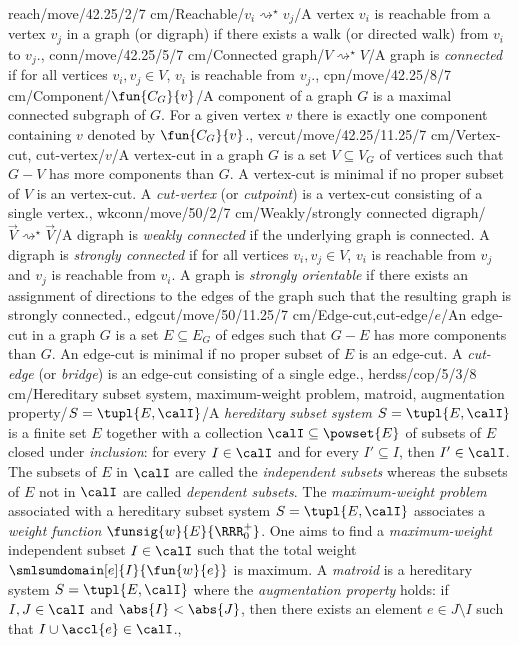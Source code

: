 reach/move/42.25/2/7 cm/{Reachable}/{$v_i\rightsquigarrow^{\star} v_j$}/{A vertex $v_i$ is reachable from a vertex $v_j$ in a graph (or digraph) if there exists a walk (or directed walk) from $v_i$ to $v_j$.},
conn/move/42.25/5/7 cm/{Connected graph}/{$V\rightsquigarrow^{\star}V$}/{A graph is \emph{connected} if for all vertices $v_i,v_j\in V$, $v_i$ is reachable from $v_j$.},
cpn/move/42.25/8/7 cm/{Component}/{$\fun{C_G}{v}$}/{A component of a graph $G$ is a maximal connected subgraph of $G$. For a given vertex $v$ there is exactly one component containing $v$ denoted by $\fun{C_G}{v}$.},
vercut/move/42.25/11.25/7 cm/{Vertex-cut, cut-vertex}/{\Rightscissors$v$}/{A vertex-cut in a graph $G$ is a set $V\subseteq V_G$ of vertices such that $G-V$ has more components than $G$. A vertex-cut is minimal if no proper subset of $V$ is an vertex-cut. A \emph{cut-vertex} (or \emph{cutpoint}) is a vertex-cut consisting of a single vertex.},
wkconn/move/50/2/7 cm/{Weakly/strongly connected digraph}/{$\vec{V}\rightsquigarrow^{\star}\vec{V}$}/{A digraph is \emph{weakly connected} if the underlying graph is connected. A digraph is \emph{strongly connected} if for all vertices $v_i,v_j\in V$, $v_i$ is reachable from $v_j$ and $v_j$ is reachable from $v_i$. A graph is \emph{strongly orientable} if there exists an assignment of directions to the edges of the graph such that the resulting graph is strongly connected.},
edgcut/move/50/11.25/7 cm/{Edge-cut,cut-edge}/{\Rightscissors$e$}/{An edge-cut in a graph $G$ is a set $E\subseteq E_G$ of edges such that $G-E$ has more components than $G$. An edge-cut is minimal if no proper subset of $E$ is an edge-cut. A \emph{cut-edge} (or \emph{bridge}) is an edge-cut consisting of a single edge.},
herdss/cop/5/3/8 cm/{Hereditary subset system, maximum-weight problem, matroid, augmentation property}/{$S=\tupl{E,\calI}$}/{A \emph{hereditary subset system} $S=\tupl{E,\calI}$ is a finite set $E$ together with a collection $\calI\subseteq\powset{E}$ of subsets of $E$ closed under \emph{inclusion}: for every $I\in\calI$ and for every $I'\subseteq I$, then $I'\in\calI$. The subsets of $E$ in $\calI$ are called the \emph{independent subsets} whereas the subsets of $E$ not in $\calI$ are called \emph{dependent subsets}. The \emph{maximum-weight problem} associated with a hereditary subset system $S=\tupl{E,\calI}$ associates a \emph{weight function} $\funsig{w}{E}{\RRR^+_0}$. One aims to find a \emph{maximum-weight} independent subset $I\in\calI$ such that the total weight $\smlsumdomain[e]{I}{\fun{w}{e}}$ is maximum. A \emph{matroid} is a hereditary system $S=\tupl{E,\calI}$ where the \emph{augmentation property} holds: if $I,J\in\calI$ and $\abs{I}<\abs{J}$, then there exists an element $e\in J\setminus I$ such that $I\cup\accl{e}\in\calI$.},
